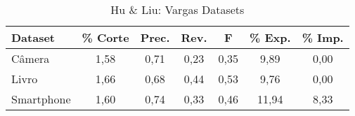 \begin{table}[!htb]
\centering
\caption{Hu \& Liu: Vargas Datasets}
\label{tab:huLiu}
\begin{tabular}{lcccccc}
    \hline
    Dataset &  \% Corte & Prec. & Rev. & F & \% Exp. & \% Imp.   \\ \hline
Câmera     &  1,58 &  0,71 & 0,23 & 0,35 & 9,89 & 0,00 \\
Livro      &  1,66 &  0,68 & 0,44 & 0,53 & 9,76 & 0,00 \\
Smartphone &  1,60 &  0,74 & 0,33 & 0,46 & 11,94 & 8,33 \\ \hline
\end{tabular}
\end{table}
